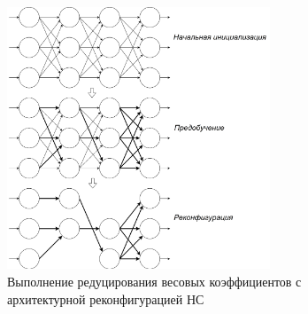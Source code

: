 \begin{figure}[H]
  \centering
  \includegraphics[width=0.7\textwidth]{man-source/images/ch2/pic2-3-1.png}
  \caption{Выполнение редуцирования весовых коэффициентов с архитектурной реконфигурацией НС}
  \label{fig:pic2_3}
\end{figure}


	

